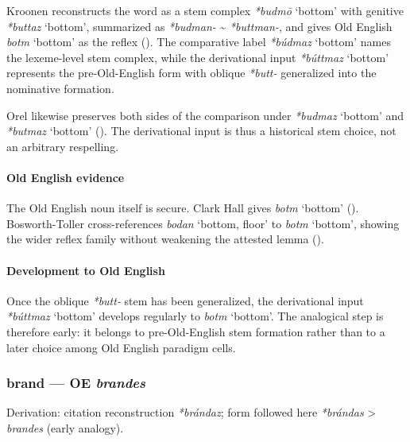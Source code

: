 \documentclass[
  british,
  a4paper,
]{article}
\providecommand{\Recon}[1]{\emph{*#1}}
\begin{document}
Kroonen reconstructs the word as a stem complex \Recon{budmō} `bottom'
with genitive \Recon{buttaz} `bottom', summarized as \emph{*budman-}
\textasciitilde{} \emph{*buttman-}, and gives Old English {\emph{botm}}
`bottom' as the reflex ().
The comparative label \Recon{búdmaz} `bottom' names the lexeme-level
stem complex, while the derivational input \Recon{búttmaz} `bottom'
represents the pre-Old-English form with oblique \emph{*butt-}
generalized into the nominative formation.

Orel likewise preserves both sides of the comparison under
\Recon{budmaz} `bottom' and \Recon{butmaz} `bottom'
(). The derivational input is
thus a historical stem choice, not an arbitrary respelling.

\paragraph{Old English evidence}\label{old-english-evidence-92}

The Old English noun itself is secure. Clark Hall gives {\emph{botm}}
`bottom' ().
Bosworth-Toller cross-references {\emph{bodan}} `bottom, floor' to
{\emph{botm}} `bottom', showing the wider reflex family without
weakening the attested lemma ().

\paragraph{Development to Old
English}\label{development-to-old-english-90}

Once the oblique \emph{*butt-} stem has been generalized, the
derivational input \Recon{búttmaz} `bottom' develops regularly to
{\emph{botm}} `bottom'. The analogical step is therefore early: it
belongs to pre-Old-English stem formation rather than to a later choice
among Old English paradigm cells.

\subsubsection{\texorpdfstring{brand --- OE
\emph{brandes}}{brand --- OE brandes}}\label{brand-oe-brandes}

Derivation: citation reconstruction \emph{*brándaz}; form followed here
\emph{*brándas} \textgreater{} \emph{brandes} (early analogy).
\end{document}
